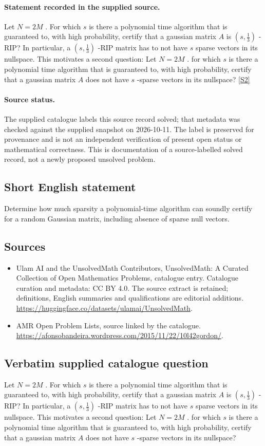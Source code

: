 \documentclass[11pt]{article}
\begin{document}
\paragraph{Statement recorded in the supplied source.}
Let $N = 2M$ . For which $s$ is there a polynomial time algorithm that is guaranteed to, with high probability, certify that a gaussian matrix $A$ is $\left(s,\frac13\right)$ -RIP? In particular, a $\left(s,\frac13\right)$ -RIP matrix has to not have $s$ sparse vectors in its nullspace. This motivates a second question: Let $N = 2M$ . for which $s$ is there a polynomial time algorithm that is guaranteed to, with high probability, certify that a gaussian matrix $A$ does not have $s$ -sparse vectors in its nullspace? \href{https://afonsobandeira.wordpress.com/2015/11/22/10l42gordon/}{[S2]}
\paragraph{Source status.}
The supplied catalogue labels this source record solved; that metadata was checked against the supplied snapshot on 2026-10-11. The label is preserved for provenance and is not an independent verification of present open status or mathematical correctness. This is documentation of a source-labelled solved record, not a newly proposed unsolved problem.
\subsection{Short English statement}
Determine how much sparsity a polynomial-time algorithm can soundly certify for a random Gaussian matrix, including absence of sparse null vectors.
\subsection{Sources}
\begin{itemize}
\item[S1] Ulam AI and the UnsolvedMath Contributors, UnsolvedMath: A Curated Collection of Open Mathematics Problems, catalogue entry. Catalogue curation and metadata: CC BY 4.0. The source extract is retained; definitions, English summaries and qualifications are editorial additions.
\url{https://huggingface.co/datasets/ulamai/UnsolvedMath}.
\item[S2] AMR Open Problem Lists, source linked by the catalogue.
\url{https://afonsobandeira.wordpress.com/2015/11/22/10l42gordon/}.
\end{itemize}
\subsection{Verbatim supplied catalogue question}
Let $N = 2M$ . For which $s$ is there a polynomial time algorithm that is guaranteed to, with high probability, certify that a gaussian matrix $A$ is $\left(s,\frac13\right)$ -RIP? In particular, a $\left(s,\frac13\right)$ -RIP matrix has to not have $s$ sparse vectors in its nullspace. This motivates a second question: Let $N = 2M$ . for which $s$ is there a polynomial time algorithm that is guaranteed to, with high probability, certify that a gaussian matrix $A$ does not have $s$ -sparse vectors in its nullspace?
\end{document}
